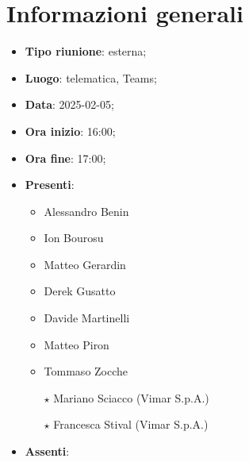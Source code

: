 \section{Informazioni generali}
\begin{itemize}
  \item \textbf{Tipo riunione}: esterna;
  \item \textbf{Luogo}: telematica, Teams;
  \item \textbf{Data}: 2025-02-05;
  \item \textbf{Ora inizio}: 16:00;
  \item \textbf{Ora fine}: 17:00;
  
  \item \textbf{Presenti}:
  \begin{itemize}
    \item Alessandro Benin
    \item Ion Bourosu
    \item Matteo Gerardin
    \item Derek Gusatto
    \item Davide Martinelli
    \item Matteo Piron
    \item Tommaso Zocche
    \item[$\star$] Mariano Sciacco (Vimar S.p.A.)
    \item[$\star$] Francesca Stival (Vimar S.p.A.)
  \end{itemize}

  \item \textbf{Assenti}:
 
\end{itemize}